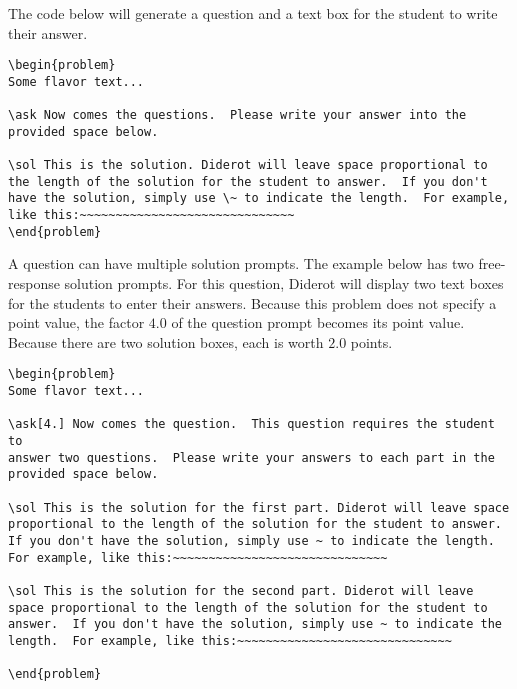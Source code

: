 \begin{example}
The code below will generate a question and a text box for the student
to write their answer.

\begin{lstlisting}
\begin{problem}
Some flavor text...

\ask Now comes the questions.  Please write your answer into the
provided space below.

\sol This is the solution. Diderot will leave space proportional to
the length of the solution for the student to answer.  If you don't
have the solution, simply use \~ to indicate the length.  For example,
like this:~~~~~~~~~~~~~~~~~~~~~~~~~~~~~~
\end{problem}
\end{lstlisting}

\end{example}

\begin{example}

A question can have multiple solution prompts.  The example below has
two free-response solution prompts. For this question, Diderot will
display two text boxes for the students to enter their answers.
%
Because this problem does not specify a point value, the factor $4.0$
of the question prompt becomes its point value.
%
Because there are two solution boxes, each is worth $2.0$ points.

\begin{lstlisting}
\begin{problem}
Some flavor text...

\ask[4.] Now comes the question.  This question requires the student to
answer two questions.  Please write your answers to each part in the
provided space below.

\sol This is the solution for the first part. Diderot will leave space
proportional to the length of the solution for the student to answer.
If you don't have the solution, simply use ~ to indicate the length.
For example, like this:~~~~~~~~~~~~~~~~~~~~~~~~~~~~~~

\sol This is the solution for the second part. Diderot will leave
space proportional to the length of the solution for the student to
answer.  If you don't have the solution, simply use ~ to indicate the
length.  For example, like this:~~~~~~~~~~~~~~~~~~~~~~~~~~~~~~

\end{problem}
\end{lstlisting}

\end{example}

